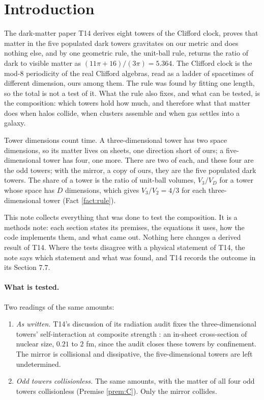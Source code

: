 \documentclass[11pt]{article}
\theoremstyle{definition}
\begin{document}
\newpage
\tableofcontents
\newpage

\section{Introduction}\label{sec:intro}

The dark-matter paper T14 \cite{ButlerT14} derives eight towers of the Clifford clock, proves that matter in the five populated dark towers gravitates on our metric and does nothing else, and by one geometric rule, the unit-ball rule, returns the ratio of dark to visible matter as $(11\pi + 16)/(3\pi) = 5.364$. The Clifford clock is the mod-$8$ periodicity of the real Clifford algebras, read as a ladder of spacetimes of different dimension, ours among them. The rule was found by fitting one length, so the total is not a test of it. What the rule also fixes, and what can be tested, is the composition: which towers hold how much, and therefore what that matter does when halos collide, when clusters assemble and when gas settles into a galaxy.

Tower dimensions count time. A three-dimensional tower has two space dimensions, so its matter lives on sheets, one direction short of ours; a five-dimensional tower has four, one more. There are two of each, and these four are the odd towers; with the mirror, a copy of ours, they are the five populated dark towers. The share of a tower is the ratio of unit-ball volumes, $V_{3}/V_{D}$ for a tower whose space has $D$ dimensions, which gives $V_{3}/V_{2} = 4/3$ for each three-dimensional tower (Fact \ref{fact:rule}).

This note collects everything that was done to test the composition. It is a methods note: each section states its premises, the equations it uses, how the code implements them, and what came out. Nothing here changes a derived result of T14. Where the tests disagree with a physical statement of T14, the note says which statement and what was found, and T14 records the outcome in its Section 7.7.

\paragraph{What is tested.} Two readings of the same amounts:
\begin{enumerate}
\item[(W)] \emph{As written.} T14's discussion of its radiation audit fixes the three-dimensional towers' self-interaction at composite strength \cite[Prop.~6.2]{ButlerT14}: an in-sheet cross-section of nuclear size, $0.21$ to $2$ fm, since the audit closes these towers by confinement. The mirror is collisional and dissipative, the five-dimensional towers are left undetermined.
\item[(C)] \emph{Odd towers collisionless.} The same amounts, with the matter of all four odd towers collisionless (Premise \ref{prem:C}). Only the mirror collides.
\end{enumerate}
\end{document}
